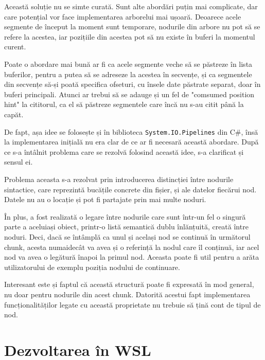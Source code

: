 \documentclass[a4paper,12pt]{report}
\begin{document}
Această soluție nu se simte curată.
Sunt alte abordări puțin mai complicate, dar care potențial vor face implementarea arborelui mai ușoară.
Deoarece acele segmente de început la moment sunt temporare,
nodurile din arbore nu pot să se refere la acestea, iar pozițiile din acestea pot să nu existe în buferi la momentul curent.

Poate o abordare mai bună ar fi ca acele segmente veche să se păstreze în lista buferilor,
pentru a putea să se adreseze la acestea în secvențe,
și ca segmentele din secvențe să-și poată specifica ofseturi,
cu însele date păstrate separat, doar în buferi principali.
Atunci ar trebui să se adauge și un fel de "comsumed position hint" la cititorul,
ca el să păstreze segmentele care încă nu s-au citit până la capăt.

De fapt, așa idee se folosește și în biblioteca \texttt{System.IO.Pipelines} din C\#,
însă la implementarea inițială nu era clar de ce ar fi necesară această abordare.
După ce s-a întâlnit problema care se rezolvă folosind această idee, s-a clarificat și sensul ei.

Problema aceasta s-a rezolvat prin introducerea distincției între nodurile sintactice,
care reprezintă bucățile concrete din fișier, și ale datelor fiecărui nod.
Datele nu au o locație și pot fi partajate prin mai multe noduri.

În plus, a fost realizată o legare între nodurile care sunt într-un fel o singură parte a aceluiași obiect,
printr-o listă semantică dublu înlănțuită, creată între noduri.
Deci, dacă se întâmplă ca unul și același nod se continuă în următorul chunk,
acesta numaidecât va avea și o referință la nodul care îl conținuă,
iar acel nod va avea o legătură înapoi la primul nod.
Aceasta poate fi util pentru a arăta utilizatorului de exemplu poziția nodului de continuare.

Interesant este și faptul că această structură poate fi expresată în mod general, nu doar pentru nodurile din acest chunk.
Datorită acestui fapt implementarea funcționalităților legate cu această proprietate
nu trebuie să țină cont de tipul de nod.


\chapter{Dezvoltarea în WSL}

\end{document}
